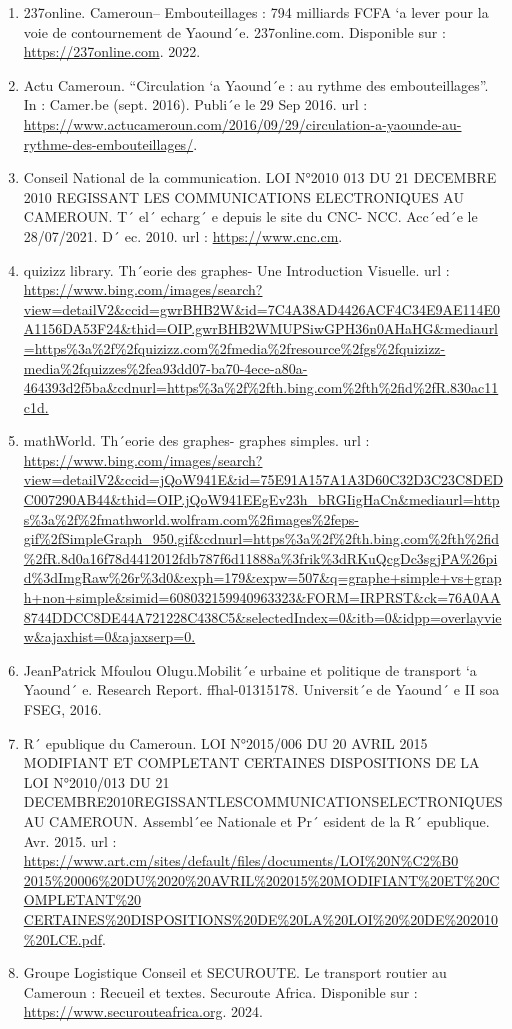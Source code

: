 \documentclass{article}
\begin{document}
\begin{enumerate}
    \item 237online. Cameroun– Embouteillages : 794 milliards FCFA `a lever pour la voie de contournement de Yaound´e. 237online.com. Disponible sur : \url{https://237online.com}. 2022.
    \item Actu Cameroun. “Circulation `a Yaound´e : au rythme des embouteillages”. In : Camer.be (sept. 2016). Publi´e le 29 Sep 2016. url : \url{https://www.actucameroun.com/2016/09/29/circulation-a-yaounde-au-rythme-des-embouteillages/}.
    \item Conseil National de la communication. LOI N°2010 013 DU 21 DECEMBRE 2010 REGISSANT LES COMMUNICATIONS ELECTRONIQUES AU CAMEROUN. T´ el´ echarg´ e depuis le site du CNC- NCC. Acc´ed´e le 28/07/2021. D´ ec. 2010. url : \url{https://www.cnc.cm}.
    \item quizizz library. Th´eorie des graphes- Une Introduction Visuelle. url : \url{https://www.bing.com/images/search?view=detailV2&ccid=gwrBHB2W&id=7C4A38AD4426ACF4C34E9AE114E0A1156DA53F24&thid=OIP.gwrBHB2WMUPSiwGPH36n0AHaHG&mediaurl=https%3a%2f%2fquizizz.com%2fmedia%2fresource%2fgs%2fquizizz-media%2fquizzes%2fea93dd07-ba70-4ece-a80a-464393d2f5ba&cdnurl=https%3a%2f%2fth.bing.com%2fth%2fid%2fR.830ac11c1d.}
    \item mathWorld. Th´eorie des graphes- graphes simples. url : \url{https://www.bing.com/images/search?view=detailV2&ccid=jQoW941E&id=75E91A157A1A3D60C32D3C23C8DEDC007290AB44&thid=OIP.jQoW941EEgEv23h_bRGIigHaCn&mediaurl=https%3a%2f%2fmathworld.wolfram.com%2fimages%2feps-gif%2fSimpleGraph_950.gif&cdnurl=https%3a%2f%2fth.bing.com%2fth%2fid%2fR.8d0a16f78d4412012fdb787f6d11888a%3frik%3dRKuQcgDc3sgjPA%26pid%3dImgRaw%26r%3d0&exph=179&expw=507&q=graphe+simple+vs+graph+non+simple&simid=608032159940963323&FORM=IRPRST&ck=76A0AA8744DDCC8DE44A721228C438C5&selectedIndex=0&itb=0&idpp=overlayview&ajaxhist=0&ajaxserp=0.}
    \item JeanPatrick Mfoulou Olugu.Mobilit´e urbaine et politique de transport `a Yaound´ e. Research Report. ffhal-01315178. Universit´e de Yaound´ e II soa FSEG, 2016.
    \item R´ epublique du Cameroun. LOI N°2015/006 DU 20 AVRIL 2015 MODIFIANT ET COMPLETANT CERTAINES DISPOSITIONS DE LA LOI N°2010/013 DU 21 DECEMBRE2010REGISSANTLESCOMMUNICATIONSELECTRONIQUES AU CAMEROUN. Assembl´ee Nationale et Pr´ esident de la R´ epublique. Avr. 2015. url : \url{https://www.art.cm/sites/default/files/documents/LOI%20N%C2%B0 2015%20006%20DU%2020%20AVRIL%202015%20MODIFIANT%20ET%20COMPLETANT%20 CERTAINES%20DISPOSITIONS%20DE%20LA%20LOI%20%20DE%202010%20LCE.pdf}.
    \item Groupe Logistique Conseil et SECUROUTE. Le transport routier au Cameroun : Recueil et textes. Securoute Africa. Disponible sur : \url{https://www.securouteafrica.org}. 2024.
\end{enumerate}
\end{document}
